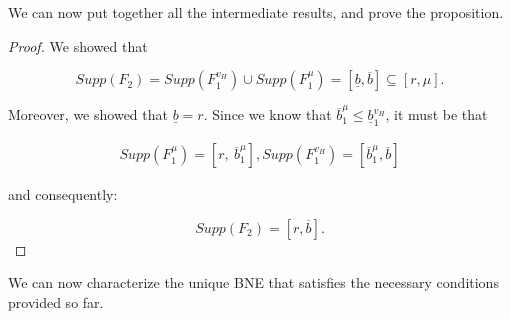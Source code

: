 \noindent We can now put together all the intermediate results, and prove the proposition.

\begin{proof}
We showed that

\begin{equation*}
 Supp(F_2) = Supp\left(F_1^{v_H}\right) \cup Supp\left(F_1^{\mu}\right) = [\underline b, \overline b] \subseteq [r, \mu].
\end{equation*}

\noindent Moreover, we showed that $ \underline b = r $. Since we know that $ \overline{b}_1^{\mu} \leq \underline{b}_1^{v_H} $, it must be that

\begin{align}\label{eq:supp-d1}
Supp\left(F_1^{\mu}\right) = \left[r,\ \overline{b}_1^{\mu}\right],  Supp\left(F_1^{v_H}\right) = \left[\overline{b}_1^{\mu}, \overline b\right]
\end{align}

\noindent and consequently:

\begin{equation}\label{eq:supp-d2}
 Supp(F_2) = [r, \overline{b}].
\end{equation}

\end{proof}

\noindent We can now characterize the unique BNE that satisfies the necessary conditions provided so far.

